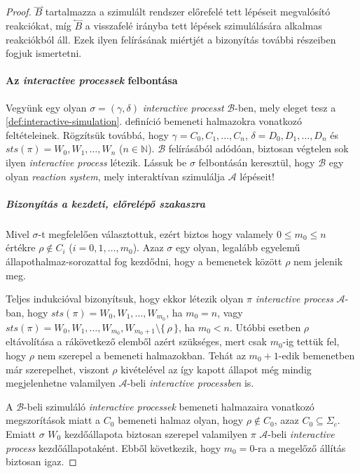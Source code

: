 \documentclass[12pt]{article}
\theoremstyle{definition}
\theoremstyle{remark}
\theoremstyle{plain}
\theoremstyle{remark}
\theoremstyle{plain}
\newcommand{\forwardhat}{\overset{\rightharpoonup}}
\newcommand{\backwardhat}{\overset{\leftharpoonup}}
\begin{document}
\begin{proof}
        $\forwardhat B$ tartalmazza a szimulált rendszer előrefelé tett lépéseit megvalósító reakciókat, míg $\backwardhat B$ a visszafelé irányba tett lépések szimulálására alkalmas reakciókból áll. Ezek ilyen felírásának miértjét a bizonyítás további részeiben fogjuk ismertetni.
        
        \paragraph{Az \textit{interactive processek} felbontása}
        Vegyünk egy olyan $\sigma = (\gamma, \delta)$ \textit{interactive processt} $\mathscr{B}$-ben, mely  eleget tesz a \ref{def:interactive-simulation}. definíció bemeneti halmazokra vonatkozó feltételeinek. Rögzítsük továbbá, hogy $\gamma = C_{0}, C_{1}, \ldots, C_{n}$, $\delta = D_{0}, D_{1}, \ldots, D_{n}$ és $\textit{sts}(\pi) = W_{0}, W_{1}, \ldots, W_{n}$ ($n \in \mathbb{N}$). $\mathscr{B}$ felírásából adódóan, biztosan végtelen sok ilyen \textit{interactive process} létezik. Lássuk be $\sigma$ felbontásán keresztül, hogy $\mathscr{B}$ egy olyan \textit{reaction system}, mely interaktívan szimulálja $\mathscr{A}$ lépéseit!

        \subparagraph{Bizonyítás a kezdeti, előrelépő szakaszra}
        Mivel $\sigma$-t megfelelően választottuk, ezért biztos hogy valamely $0 \leq m_{0} \leq n$ értékre $\rho \notin C_{i}$ ($i = 0, 1, \ldots, m_{0}$). Azaz $\sigma$ egy olyan, legalább egyelemű állapothalmaz-sorozattal fog kezdődni, hogy a bemenetek között $\rho$ nem jelenik meg.
        
        Teljes indukcióval bizonyítsuk, hogy ekkor létezik olyan $\pi$ \textit{interactive process} $\mathscr{A}$-ban, hogy $\textit{sts}(\pi) = W_{0}, W_{1}, \ldots, W_{m_{0}}$, ha $m_{0} = n$, vagy $\textit{sts}(\pi) = W_{0}, W_{1}, \ldots, W_{m_{0}}, W_{m_{0} + 1} \setminus \{ \,\rho\,\}$, ha $m_{0} < n$. Utóbbi esetben $\rho$ eltávolítása a rákövetkező elemből azért szükséges, mert csak $m_{0}$-ig tettük fel, hogy $\rho$ nem szerepel a bemeneti halmazokban. Tehát az $m_{0}+1$-edik bemenetben már szerepelhet, viszont $\rho$ kivételével az így kapott állapot még mindig megjelenhetne valamilyen $\mathscr{A}$-beli \textit{interactive processben} is.
        
        A $\mathscr{B}$-beli szimuláló \textit{interactive processek} bemeneti halmazaira vonatkozó megszorítások miatt a $C_{0}$ bemeneti halmaz olyan, hogy $\rho \notin C_{0}$, azaz $C_{0} \subseteq \Sigma_{c}$. Emiatt $\sigma$ $W_{0}$ kezdőállapota biztosan szerepel valamilyen $\pi$ $\mathscr{A}$-beli \textit{interactive process} kezdőállapotaként. Ebből következik, hogy $m_{0} = 0$-ra a megelőző állítás biztosan igaz.
        

\end{proof}
\end{document}
